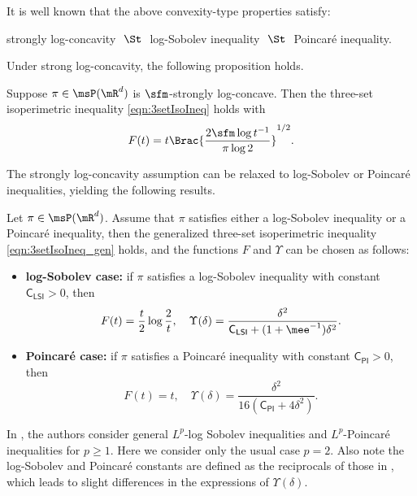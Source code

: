 \documentclass[11pt]{article}
\newcommand{\CPI}{\mathsf{C_{PI}}}
\newcommand{\CLSI}{\mathsf{C_{LSI}}}
\begin{document}
It is well known \citep{MR3155209} that the above convexity-type properties satisfy:
\begin{center}
    strongly log-concavity $~\St~$ log-Sobolev inequality $~\St~$ Poincar\'e inequality.
\end{center}
%
Under strong log-concavity, the following proposition holds.
%
\begin{prop}
\label{prop:convex_IsoIneq}
Suppose $\pi \in \msP(\mR^d)$ is $\sfm$-strongly log-concave.
Then the three-set isoperimetric inequality \eqref{eqn:3setIsoIneq} holds with
\begin{equation}
\label{eqn:F_convex}
    F(t) = t \Brac{ \frac{2 \sfm \log t^{-1} }{\pi \log 2} }^{1/2}.
\end{equation}
\end{prop}



The strongly log-concavity assumption can be relaxed to log-Sobolev or Poincar\'e inequalities, yielding the following results.
%
\begin{prop}
\label{prop:functional_IsoIneq}
Let $\pi \in \msP(\mR^d)$.
Assume that $\pi$ satisfies either a log-Sobolev inequality or a Poincar\'e inequality, then the generalized three-set isoperimetric inequality \eqref{eqn:3setIsoIneq_gen} holds, and the functions $F$ and $\Upsilon$ can be chosen as follows:
\begin{itemize}
    \item \textbf{log-Sobolev case:} if $\pi$ satisfies a log-Sobolev inequality with constant $\CLSI>0$, then
    \begin{equation}
    \label{eqn:F_Ups_LSI}
        F(t) = \frac{t}{2}\log\frac{2}{t}, \quad \Upsilon(\delta) = \frac{\delta^2}{\CLSI+(1+\mee^{-1})\delta^2}.
    \end{equation}
    \item \textbf{Poincar\'e case:} if $\pi$ satisfies a Poincar\'e inequality with constant $\CPI>0$, then
    \begin{equation}
    \label{eqn:F_Ups_PI}
        F(t) = t, \quad \Upsilon(\delta) = \frac{\delta^2}{16(\CPI+4\delta^2)}.
    \end{equation}
\end{itemize}
\end{prop}

\begin{rem}
In \cite{goyal2025mixing}, the authors consider general $L^p$-log Sobolev inequalities and $L^p$-Poincar\'e inequalities for $p\ge 1$.
Here we consider only the usual case $p=2$.
Also note the log-Sobolev and Poincar\'e constants are defined as the reciprocals of those in \cite{goyal2025mixing}, which leads to slight differences in the expressions of $\Upsilon(\delta)$.
\end{rem}
\end{document}

